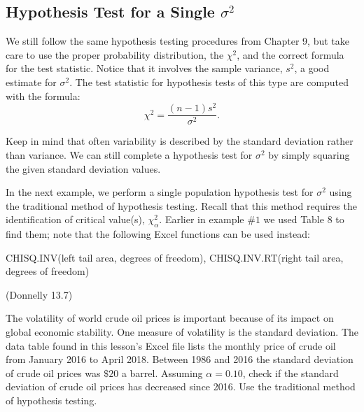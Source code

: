 \documentclass[12pt, letterpaper]{article}
\newcounter{exercise}
\theoremstyle{definition}
\begin{document}
\begin{statement}
\section*{Hypothesis Test for a Single $\sigma^2$}

\noindent We still follow the same hypothesis testing procedures from Chapter 9, but take care to use the proper probability distribution, the $\chi^2$, and the correct formula for the test statistic.  Notice that it involves the sample variance, $s^2$, a good estimate for $\sigma^2$.  The test statistic for hypothesis tests of this type are computed with the formula:
$$ \chi^2 = \frac{(n-1)s^2}{\sigma^2}. $$

\noindent Keep in mind that often variability is described by the standard deviation rather than variance.  We can still complete a hypothesis test for $\sigma^2$ by simply squaring the given standard deviation values.

\vspace*{.1in}

In the next example, we perform a single population hypothesis test for $\sigma^2$ using the traditional method of hypothesis testing.  Recall that this method requires the identification of critical value(s), $\chi_{\alpha}^2$.  Earlier in example $\#1$ we used Table 8 to find them; note that the following Excel functions can be used instead:
\begin{center}
CHISQ.INV(left tail area, degrees of freedom), CHISQ.INV.RT(right tail area, degrees of freedom)
\end{center}

\end{statement}


\begin{exercise}  (Donnelly 13.7)

The volatility of world crude oil prices is important because of its impact on global economic stability.  One measure of volatility is the standard deviation.  The data table found in this lesson's Excel file lists the monthly price of crude oil from January 2016 to April 2018.  Between 1986 and 2016 the standard deviation of crude oil prices was $\$20$ a barrel.  Assuming $\alpha = 0.10$, check if the standard deviation of crude oil prices has decreased since 2016.  Use the traditional method of hypothesis testing.

\end{exercise}

\vfill
\end{document}
